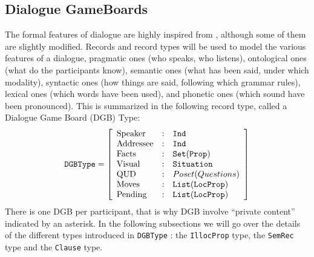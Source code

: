 \documentclass[11pt]{article}
\begin{document}
		\subsection{Dialogue GameBoards}
			The formal features of dialogue are highly inspired from \cite{ginzburg2012,ginzburg2017}, although some of them are slightly modified.
			Records and record types will be used to model the various features of a dialogue, pragmatic ones (who speaks, who listens), ontological ones (what do the participants know), semantic ones (what has been said, under which modality), syntactic ones (how things are said, following which grammar rules), lexical ones (which words have been used), and phonetic ones (which sound have been pronounced). This is summarized in the following record type, called a Dialogue Game Board (DGB) Type:
			\begin{equation*}
				\texttt{DGBType} =
				\left[
				\begin{array}{l l l}
				\mbox{Speaker}  &:& \texttt{Ind} \\
				\mbox{Addressee} &:& \texttt{Ind} \\
				\mbox{Facts} &:& \texttt{Set}(\texttt{Prop}) \\
				\mbox{Visual} &:& \texttt{Situation} \\
				\mbox{QUD}  &:& Poset(Questions)\\
				\mbox{Moves}  &:& \texttt{List}(\texttt{LocProp})\\
				\mbox{Pending} &:& \texttt{List}(\texttt{LocProp})
				\end{array}
				\right ]
				\label{dgb_type}
			\end{equation*}
			There is one DGB per participant, that is why DGB involve ``private content'' indicated by an asterisk. In the following subsections we will go over the details of the different types introduced in \texttt{DGBType} : the \texttt{IllocProp} type, the \texttt{SemRec} type and  the \texttt{Clause} type.
\end{document}
